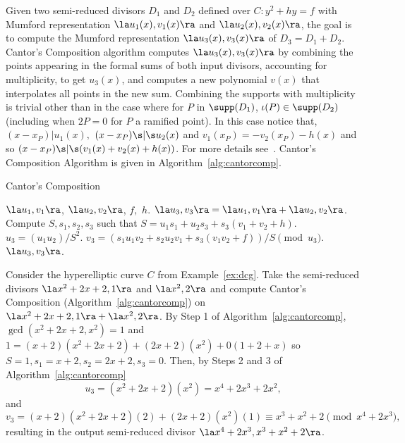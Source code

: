 Given two semi-reduced divisors $D_1$ and $D_2$ defined over $C : y^2 + hy = f$
with Mumford representation $\la u_1(x),v_1(x) \ra$ and $\la u_2(x),v_2(x) \ra$,
the goal is to compute the Mumford representation $\la u_3(x),v_3(x) \ra$ of
$D_3 = D_1 + D_2$. Cantor's Composition algorithm computes $\la u_3(x),v_3(x)
\ra$ by combining the points appearing in the formal sums of both input
divisors, accounting for multiplicity, to get $u_3(x)$, and computes a new
polynomial $v(x)$ that interpolates all points in the new sum. Combining the
supports with multiplicity is trivial other than in the case where for $P$ in
$\supp(D_1)$, $\iota(P) \in \supp(D_2)$ (including when $2P = 0$ for $P$ a
ramified point). In this case notice that, $(x - x_P)|u_1(x),$ $(x - x_P) \s |\s
u_2(x)$ and $v_1(x_P) = -v_2(x_P) - h(x)$ and so $(x - x_P) \s |\s (v_1(x) +
v_2(x) + h(x))$. For more details see~\cite[Section~10.3.2]{Galbraith_PKC_2012}.
Cantor's Composition Algorithm is given in Algorithm~\ref{alg:cantorcomp}.


\begin{algorithm}[ht]
  \caption{Cantor's Composition}
  \label{alg:cantorcomp}
  {\fontsize{12}{18}\selectfont
  \begin{algorithmic}[1]
  \Require $\la u_1,v_1 \ra$, $\la u_2,v_2 \ra$, $f,$ $h.$
  \Ensure $\la u_3,v_3 \ra = \la u_1,v_1 \ra + \la u_2,v_2 \ra$.
  \vspace{5pt}
  \State Compute $S,s_1,s_2,s_3$ such that $S = u_1s_1 + u_2s_3 + s_3(v_1 + v_2 + h)$.
  \State $u_3 = (u_1u_2)/S^2$.
  \State $v_3 = (s_1u_1v_2 + s_2u_2v_1 + s_3(v_1v_2 + f))/S \pmod{u_3}$.
  \State \Return $\la u_3,v_3 \ra$.
  \end{algorithmic}
  }
\end{algorithm}

\be\label{ex:forreduce}
Consider the hyperelliptic curve $C$ from Example~\ref{ex:dcg}. Take the semi-reduced
divisors $\la x^2 + 2x + 2,1 \ra$ and $\la x^2,2 \ra$ and compute Cantor's
Composition (Algorithm~\ref{alg:cantorcomp}) on $\la x^2 + 2x + 2,1 \ra + \la
x^2,2 \ra$. By Step 1 of Algorithm~\ref{alg:cantorcomp}, $\gcd(x^2 + 2x + 2,x^2)
= 1$ and $1 = (x+2)(x^2 + 2x + 2) + (2x + 2)(x^2) + 0(1 + 2 + x)$ so $S = 1, s_1
= x + 2, s_2 = 2x + 2, s_3 = 0$. Then, by Steps 2 and 3 of
Algorithm~\ref{alg:cantorcomp}
$$u_3 = (x^2 + 2x + 2)(x^2) = x^4 + 2x^3 + 2x^2,$$ and $$v_3 = (x + 2)(x^2 + 2x
+ 2)(2) + (2x + 2)(x^2)(1) \equiv x^3 + x^2 + 2 \pmod{x^4 + 2x^3},$$ resulting
in the output semi-reduced divisor $\la x^4 + 2x^3, x^3 + x^2 + 2 \ra$.
\ee

